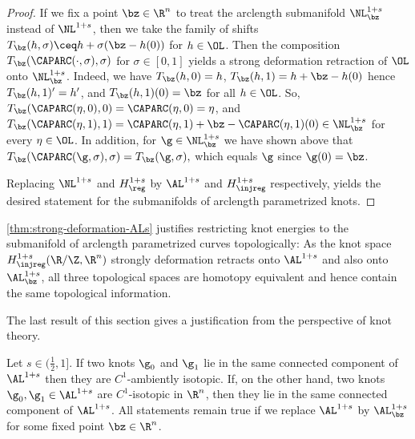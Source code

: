 \begin{proof}
If we fix a point $\bz\in\R^n$ to treat the arclength submanifold
$\NL^{1+s}_{\bz}$ instead of $\NL^{1+s}$, then we take 
the family of shifts $T_\bz(h,\sigma)\ceq
h+\sigma(\bz-h(0))$ for $h\in\OL$. 
Then the composition
$T_\bz(\CAPARC(\cdot,\sigma),\sigma)$ for $\sigma\in [0,1]$
yields a strong deformation retraction of $\OL$ onto $\NL^{1+s}_\bz$.
Indeed, we have
$T_\bz(h,0)=h$, 
$T_\bz(h,1)=h+\bz-h(0)$ hence $T_\bz(h,1)'=
h'$, and
$T_\bz(h,1)(0)=\bz$ for all $h\in \OL$.
So, $T_\bz(\CAPARC(\eta,0),0)=\CAPARC(\eta,0)=\eta$, and
$T_\bz(\CAPARC(\eta,1),1)=\CAPARC(\eta,1)+\bz-\CAPARC(\eta,1)(0)
\in\NL^{1+s}_\bz$ for every $\eta\in\OL$. In addition,
for $\g\in\NL^{1+s}_\bz$ we have shown above
that $T_\bz(\CAPARC(\g,\sigma),\sigma)=
T_\bz(\g,\sigma),$
which equals $\g$
since $\g(0)=\bz$.

Replacing $ \NL^{1+s} $ and $ H^{1+s}_{\reg} $ by $ \AL^{1+s} $ and $ H^{1+s}_{\injreg} $ respectively, yields the desired statement for the submanifolds of arclength parametrized knots. 
\end{proof}
\begin{remark}\label{rem:topological-justification-AL}
\cref{thm:strong-deformation-ALs} 
justifies restricting knot energies to the submanifold of arclength parametrized
curves topologically: As the knot space $H^{1+s}_\injreg(\R/\Z,\R^n)$ strongly
deformation retracts onto $\AL^{1+s}$ and also onto $\AL^{1+s}_\bz$, all
three topological spaces are homotopy equivalent and hence contain
the same topological information. 
\end{remark}
The last result of this section gives a justification from the perspective of knot theory. 
\begin{theorem}
\label{thm:components-knot-classes}
Let $s\in (\frac{1}{2},1]$. If two knots $\g_0$ and $\g_1$ lie in the same
connected component of $\AL^{1+s}$ then they are $C^1$-ambiently isotopic.
If, on the other hand,
two knots $\g_0,\g_1\in\AL^{1+s}$ are $C^1$-isotopic in 
$\R^n$,
then they lie in the same connected component
of $\AL^{1+s}$.
All statements remain 
true if we replace $\AL^{1+s}$ by $\AL^{1+s}_\bz$ for some fixed point
$\bz\in\R^n$.
\end{theorem}

